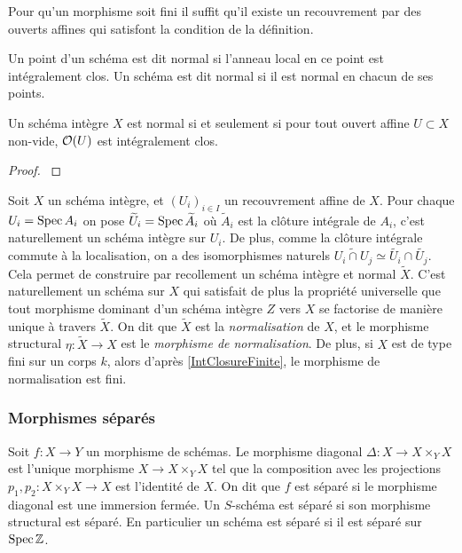 \begin{rem}
Pour qu'un morphisme soit fini il suffit qu'il existe un recouvrement par des ouverts affines qui satisfont la condition de la définition.
\end{rem}


\begin{defn}
Un point d'un schéma est dit normal si l'anneau local en ce point est intégralement clos.
Un schéma est dit normal si il est normal en chacun de ses points.
\end{defn}

\begin{prop}
Un schéma intègre $X$ est normal si et seulement si pour tout ouvert affine $U\subset X$ non-vide, $\mathcal{O}(U)$ est intégralement clos.
\end{prop}
\begin{proof}
\cite[4.1.5]{QingLiu} 
\end{proof}


Soit $X$ un schéma intègre, et $(U_i)_{i\in I}$ un recouvrement affine de $X$. Pour chaque $U_i=\operatorname{Spec} A_i$ on pose $\widetilde{U}_i=\operatorname{Spec} \widetilde{A}_i$ où $\widetilde{A}_i$ est la clôture intégrale de $A_i$, c'est naturellement un schéma intègre sur $U_i$. De plus, comme la clôture intégrale  commute à la localisation, on a des isomorphismes naturels $\widetilde{U_i\cap U_j}\simeq \widetilde{U_i}\cap \widetilde{U_j}$. Cela permet de construire par recollement un schéma intègre et normal $\widetilde{X}$. C'est naturellement un schéma sur $X$ qui satisfait de plus la propriété universelle que tout morphisme dominant d'un schéma intègre $Z$ vers $X$ se factorise de manière unique à travers $\widetilde{X}$. On dit que $\widetilde{X}$ est la \textit{normalisation} de $X$, et le morphisme structural $\eta:\widetilde{X}\rightarrow X$ est le \textit{morphisme de normalisation}. De plus, si $X$ est de type fini sur un corps $k$, alors d'après \ref{IntClosureFinite}, le morphisme de normalisation est fini.

\subsubsection{Morphismes séparés}

\begin{defn}
Soit $f:X\rightarrow Y$ un morphisme de schémas. Le morphisme diagonal $\Delta:X\rightarrow X\times_Y X$ est l'unique morphisme $X\rightarrow X\times_Y X$ tel que la composition avec les projections $p_1,p_2:X\times_Y X\rightarrow X$ est l'identité de $X$. On dit que $f$ est séparé si le morphisme diagonal est une immersion fermée.
Un $S$-schéma est séparé si son morphisme structural est séparé. En particulier un schéma est séparé si il est séparé sur $\operatorname{Spec}\mathbb{Z}$.
\end{defn}

